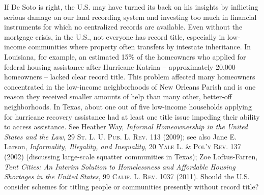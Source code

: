 If De Soto is right, the U.S. may have turned its back on his insights by
inflicting serious damage on our land recording system and investing too much
in financial instruments for which no centralized records are available. Even
without the mortgage crisis, in the U.S., not everyone has record title,
especially in low-income communities where property often transfers by
intestate inheritance. In Louisiana, for example, an estimated 15\% of the
homeowners who applied for federal housing assistance after Hurricane Katrina
-- approximately 20,000 homeowners -- lacked clear record title. This problem
affected many homeowners concentrated in the low-income neighborhoods of New
Orleans Parish and is one reason they received smaller amounts of help than
many other, better-off neighborhoods. In Texas, about one out of five
low-income households applying for hurricane recovery assistance had at least
one title issue impeding their ability to access assistance. See Heather Way,
\textit{Informal Homeownership in the United States and the Law}, 29
\textsc{St. L. U. Pub. L. Rev.} 113 (2009); see also Jane E. Larson,
\textit{Informality, Illegality, and Inequality}, 20 \textsc{Yale L. \& Pol'y
Rev.} 137 (2002) (discussing large-scale squatter communities in Texas); Zoe
Loftus-Farren, \textit{Tent Cities: An Interim Solution to Homelessness and
Affordable Housing Shortages in the United States}, 99 \textsc{Calif. L. Rev.}
1037 (2011). Should the U.S. consider schemes for titling people or communities
presently without record title?

